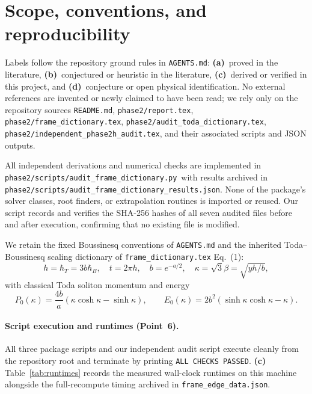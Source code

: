 \documentclass[11pt,a4paper]{article}
\newcommand{\La}{\textsf{\textbf{(a)}}\ }
\newcommand{\Lb}{\textsf{\textbf{(b)}}\ }
\newcommand{\Lc}{\textsf{\textbf{(c)}}\ }
\newcommand{\Ld}{\textsf{\textbf{(d)}}\ }
\newcommand{\scr}{\texttt{audit\_\allowbreak frame\_\allowbreak dictionary.py}}
\newcommand{\res}{\texttt{audit\_\allowbreak frame\_\allowbreak dictionary\_\allowbreak results.json}}
\begin{document}
\section{Scope, conventions, and reproducibility}
Labels follow the repository ground rules in \texttt{AGENTS.md}: \La proved in
the literature, \Lb conjectured or heuristic in the literature, \Lc derived or
verified in this project, and \Ld conjecture or open physical identification.
No external references are invented or newly claimed to have been read; we rely
only on the repository sources \texttt{README.md}, \texttt{phase2/report.tex},
\texttt{phase2/frame\_\allowbreak dictionary.tex},
\texttt{phase2/audit\_\allowbreak toda\_\allowbreak dictionary.tex},
\texttt{phase2/independent\_\allowbreak phase2h\_\allowbreak audit.tex}, and
their associated scripts and JSON outputs.

All independent derivations and numerical checks are implemented in
\texttt{phase2/\allowbreak scripts/}\scr\ with results archived in
\texttt{phase2/\allowbreak scripts/}\res. None of the package's solver classes, root
finders, or extrapolation routines is imported or reused. Our script records
and verifies the SHA-256 hashes of all seven audited files before and after
execution, confirming that no existing file is modified.

We retain the fixed Boussinesq conventions of \texttt{AGENTS.md} and the
inherited Toda--Boussinesq scaling dictionary of
\texttt{frame\_\allowbreak dictionary.tex} Eq.~(1):
\[
 h=\hbar_T=3b\hbar_B,\quad t=2\pi h,\quad b=e^{-a/2},\quad
 \kappa=\sqrt3\beta=\sqrt{yh/b},
\]
with classical Toda soliton momentum and energy
\[
 P_0(\kappa)=\frac{4b}{a}(\kappa\cosh\kappa-\sinh\kappa),\qquad
 E_0(\kappa)=2b^2(\sinh\kappa\cosh\kappa-\kappa).
\]

\paragraph{Script execution and runtimes (Point~6).}
All three package scripts and our independent audit script execute cleanly from
the repository root and terminate by printing \texttt{ALL CHECKS PASSED}. \Lc
Table~\ref{tab:runtimes} records the measured wall-clock runtimes on this
machine alongside the full-recompute timing archived in
\texttt{frame\_\allowbreak edge\_\allowbreak data.json}.
\end{document}

